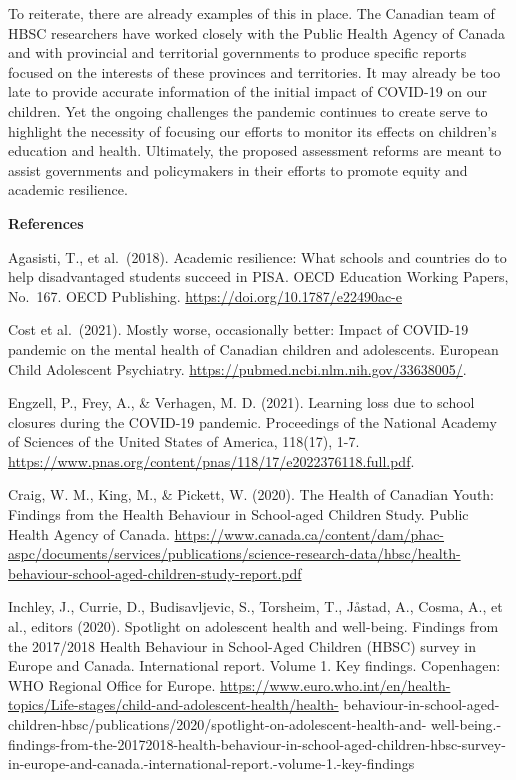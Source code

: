 \documentclass[
]{book}
\begin{document}
To reiterate, there are already examples of this in place. The Canadian team of HBSC researchers have worked closely with the Public Health Agency of Canada and with provincial and territorial governments to produce specific reports focused on the interests of these provinces and territories. It may already be too late to provide accurate information of the initial impact of COVID-19 on our children. Yet the ongoing challenges the pandemic continues to create serve to highlight the necessity of focusing our efforts to monitor its effects on children's education and health. Ultimately, the proposed assessment reforms are meant to assist governments and policymakers in their efforts to promote equity and academic resilience.

\textbf{References}

Agasisti, T., et al.~(2018). Academic resilience: What schools and countries do to help disadvantaged students succeed in PISA. OECD Education Working Papers, No.~167. OECD Publishing. \url{https://doi.org/10.1787/e22490ac-e}

Cost et al.~(2021). Mostly worse, occasionally better: Impact of COVID-19 pandemic on the mental health of Canadian children and adolescents. European Child Adolescent Psychiatry. \url{https://pubmed.ncbi.nlm.nih.gov/33638005/}.

Engzell, P., Frey, A., \& Verhagen, M. D. (2021). Learning loss due to school closures during the COVID-19 pandemic. Proceedings of the National Academy of Sciences of the United States of America, 118(17), 1-7. \url{https://www.pnas.org/content/pnas/118/17/e2022376118.full.pdf}.

Craig, W. M., King, M., \& Pickett, W. (2020). The Health of Canadian Youth: Findings from the Health Behaviour in School-aged Children Study. Public Health Agency of Canada. \url{https://www.canada.ca/content/dam/phac-aspc/documents/services/publications/science-research-data/hbsc/health-behaviour-school-aged-children-study-report.pdf}

Inchley, J., Currie, D., Budisavljevic, S., Torsheim, T., Jåstad, A., Cosma, A., et al., editors (2020). Spotlight on adolescent health and well-being. Findings from the 2017/2018 Health Behaviour in School-Aged Children (HBSC) survey in Europe and Canada. International report. Volume 1. Key findings. Copenhagen: WHO Regional Office for Europe. \url{https://www.euro.who.int/en/health-topics/Life-stages/child-and-adolescent-health/health-} behaviour-in-school-aged-children-hbsc/publications/2020/spotlight-on-adolescent-health-and- well-being.-findings-from-the-20172018-health-behaviour-in-school-aged-children-hbsc-survey- in-europe-and-canada.-international-report.-volume-1.-key-findings
\end{document}
